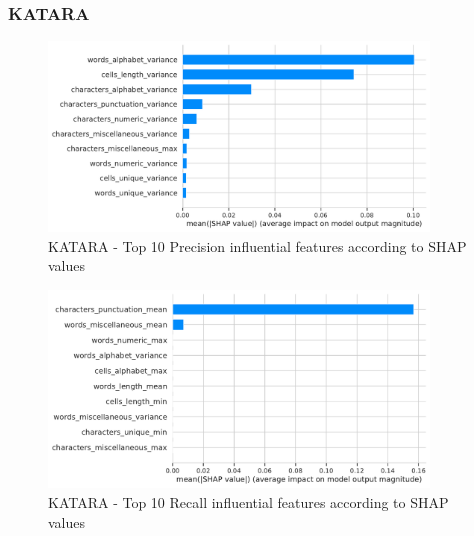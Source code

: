 \subsubsection{KATARA}
\begin{figure}[H]
    \centering
    \includegraphics[width=0.9\textwidth]{thesis/Figures/RQ4/Shap_cell_prec_KATARA.pdf}
    \caption{KATARA - Top 10 Precision influential features according to SHAP values}
    \label{fig:feature_importance_prec_KATARA}
\end{figure}
\begin{figure}[H]
    \centering
    \includegraphics[width=0.9\textwidth]{thesis/Figures/RQ4/Shap_cell_rec_KATARA.pdf}
    \caption{KATARA - Top 10 Recall influential features according to SHAP values}
    \label{fig:feature_importance_rec_KATARA}
\end{figure}

